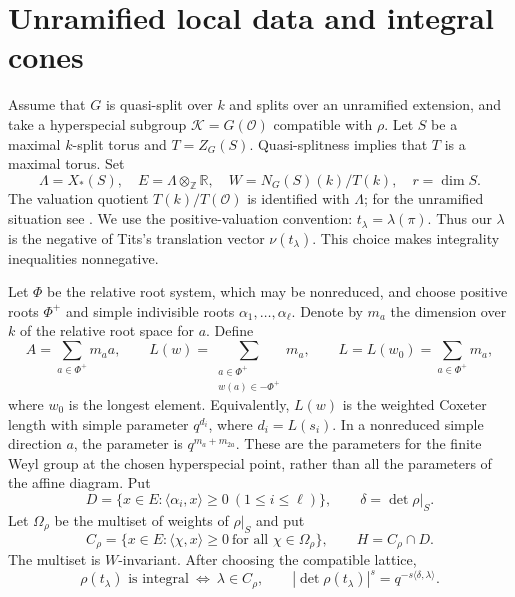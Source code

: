 \documentclass[11pt,a4paper]{article}
\theoremstyle{definition}
\newcommand{\Z}{\mathbb Z}
\newcommand{\R}{\mathbb R}
\newcommand{\OO}{\mathcal O}
\begin{document}
\section{Unramified local data and integral cones}\label{sec:local}
 Assume that $G$ is quasi-split over $k$ and
splits over an unramified extension, and take a hyperspecial subgroup
$\mathcal K=G(\OO)$ compatible with $\rho$. Let $S$ be a maximal
$k$-split torus and $T=Z_G(S)$. Quasi-splitness implies that $T$ is a
maximal torus. Set
\[
 \Lambda=X_*(S),\quad E=\Lambda\otimes_{\Z}\R,\quad
 W=N_G(S)(k)/T(k),\quad r=\dim S.
\]
The valuation quotient $T(k)/T(\OO)$ is identified with $\Lambda$;
for the unramified situation see \cite[\S1.3]{Tits}. We use the
positive-valuation convention: $t_\lambda=\lambda(\pi)$.
Thus our $\lambda$ is the negative of Tits's translation vector
$\nu(t_\lambda)$. This choice makes integrality inequalities nonnegative.

Let $\Phi$ be the relative root system, which may be nonreduced, and
choose positive roots $\Phi^+$ and simple indivisible roots
$\alpha_1,\ldots,\alpha_\ell$. Denote by $m_a$ the dimension over
$k$ of the relative root space for $a$. Define
\begin{equation}\label{eq:AL}
 A=\sum_{a\in\Phi^+}m_a a,\qquad
 L(w)=\sum_{\substack{a\in\Phi^+\\w(a)\in-\Phi^+}}m_a,
 \qquad L=L(w_0)=\sum_{a\in\Phi^+}m_a,
\end{equation}
where $w_0$ is the longest element. Equivalently, $L(w)$ is the
weighted Coxeter length with simple parameter $q^{d_i}$, where
$d_i=L(s_i)$. In a nonreduced simple direction $a$, the parameter
is $q^{m_a+m_{2a}}$. These are the parameters for the finite Weyl group
at the chosen hyperspecial point, rather than all the parameters of
the affine diagram. Put
\[
 D=\{x\in E:\langle\alpha_i,x\rangle\geq0\ (1\leq i\leq\ell)\},
 \qquad \delta=\det\rho|_S.
\]
Let $\Omega_\rho$ be the multiset of weights of $\rho|_S$ and put
\begin{equation}\label{eq:cones}
 C_\rho=\{x\in E:\langle\chi,x\rangle\geq0\ \text{for all }
                 \chi\in\Omega_\rho\},\qquad H=C_\rho\cap D.
\end{equation}
The multiset is $W$-invariant. After choosing the compatible lattice,
\begin{equation}\label{eq:integrality}
 \rho(t_\lambda)\text{ is integral}\ \Longleftrightarrow\
 \lambda\in C_\rho,\qquad
 |\det\rho(t_\lambda)|^s=q^{-s\langle\delta,\lambda\rangle}.
\end{equation}
\end{document}
